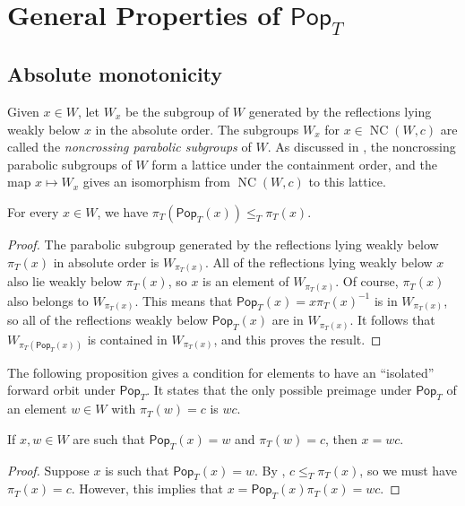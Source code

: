 \documentclass[ALCO,ThmDefs,Unicode,epreuves]{cedram}
\newcommand{\darkblue}{\color{darkblue}}
\newcommand{\defn}[1]{\emph{\darkblue #1}}
\newcommand{\pop}{\mathsf{Pop}}
\DeclareMathOperator{\NC}{NC}
\begin{document}
\section{General Properties of \texorpdfstring{$\pop_T$}{Pop}}
\label{sec:general_properties}

\subsection{Absolute monotonicity}

Given $x\in W$, let $W_x$ be the subgroup of $W$ generated by the reflections lying weakly below $x$ in the absolute order. The subgroups $W_x$ for $x\in \NC(W,c)$ are called the \defn{noncrossing parabolic subgroups} of $W$. As discussed in \cite{ReadingNoncrossing}, the noncrossing parabolic subgroups of $W$ form a lattice under the containment order, and the map $x\mapsto W_x$ gives an isomorphism from $\NC(W,c)$ to this lattice. 

\begin{lemma}
\label{lem:monotone}
For every $x \in W$, we have $\pi_T(\pop_T(x))\leq_T \pi_T(x)$.
\end{lemma}
\begin{proof}
The parabolic subgroup generated by the reflections lying weakly below $\pi_T(x)$ in absolute order is $W_{\pi_T(x)}$. All of the reflections lying weakly below $x$ also lie weakly below $\pi_T(x)$, so $x$ is an element of $W_{\pi_T(x)}$. Of course, $\pi_T(x)$ also belongs to $W_{\pi_T(x)}$. This means that $\pop_T(x)=x\pi_T(x)^{-1}$ is in $W_{\pi_T(x)}$, so all of the reflections weakly below $\pop_T(x)$ are in $W_{\pi_T(x)}$. It follows that 
$W_{\pi_T(\pop_T(x))}$ is contained in $W_{\pi_T(x)}$, and this proves the result. 
\end{proof}

The following proposition gives a condition for elements to have an ``isolated'' forward orbit under $\pop_T$. It states that the only possible preimage under $\pop_T$ of an element $w \in W$ with $\pi_T(w)=c$ is $wc$.

\begin{prop}
\label{prop:preimages}
If $x,w\in W$ are such that $\pop_T(x)=w$ and $\pi_T(w)=c$, then $x=wc$.
\end{prop}

\begin{proof}
Suppose $x$ is such that $\pop_T(x)=w$.  By , $c\leq_T\pi_T(x)$, so we must have $\pi_T(x)=c$. However, this implies that $x=\pop_T(x)\pi_T(x)=wc$.  
\end{proof}
\end{document}
